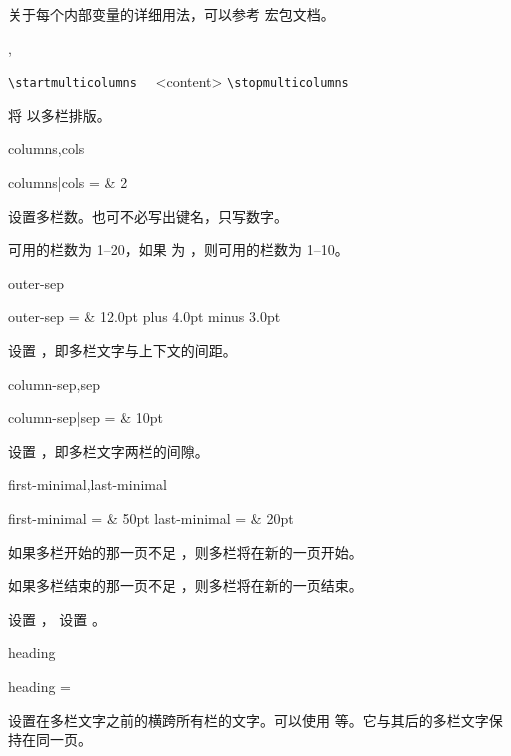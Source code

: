 \documentclass[twoside]{book}
\newcommand{\pkgdoc}[1]{\pkg{#1} 宏包文档}
\begin{document}
关于每个内部变量的详细用法，可以参考 \pkgdoc{multicol}。

\begin{function}{\startmulticolumns,\stopmulticolumns}
  \begin{syntax}
    \verb|\startmulticolumns| 
    ~~<content>
    \verb|\stopmulticolumns|
  \end{syntax}
将  以多栏排版。
\end{function}

\begin{keyval}[path=multicolumns]{columns,cols}
  \begin{syntax}
    columns|cols =  & 2
  \end{syntax}
设置多栏数。也可不必写出键名，只写数字。

可用的栏数为 1--20，如果  为
，则可用的栏数为 1--10。
\end{keyval}

\begin{keyval}[path=multicolumns]{outer-sep}
  \begin{syntax}
    outer-sep =  & 12.0pt plus 4.0pt minus 3.0pt
  \end{syntax}
设置 ，即多栏文字与上下文的间距。
\end{keyval}

\begin{keyval}[path=multicolumns]{column-sep,sep}
  \begin{syntax}
    column-sep|sep =  & 10pt 
  \end{syntax}
设置 ，即多栏文字两栏的间隙。
\end{keyval}

\begin{keyval}[path=multicolumns]{first-minimal,last-minimal}
  \begin{syntax}
    first-minimal =  & 50pt 
    last-minimal  =  & 20pt 
  \end{syntax}
如果多栏开始的那一页不足 ，则多栏将在新的一页开始。

如果多栏结束的那一页不足 ，则多栏将在新的一页结束。

 设置 ，
 设置 。
\end{keyval}

\begin{keyval}[path=multicolumns]{heading}
  \begin{syntax}
    heading = 
  \end{syntax}
设置在多栏文字之前的横跨所有栏的文字。可以使用  等。它与其后的多栏文字保持在同一页。
\end{keyval}
\end{document}
